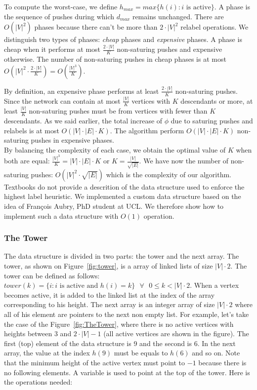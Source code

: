 To compute the worst-case, we define $h_{max} = max\{h(i) : i\text{ is active}\}$. A phase is the sequence of pushes during which $d_{max}$ remains unchanged. There are $O(|V|^2)$ phases because there can't be more than $2\cdot|V|^2$ relabel operations. We distinguish two types of phases: \textit{cheap} phases and \textit{expensive} phases. A phase is cheap when it performs at most $\frac{2\cdot|V|}{K}$ non-saturing pushes and expensive otherwise. The number of non-saturing pushes in cheap phases is at most $O(|V|^2 \cdot \frac{2\cdot|V|}{K}) = O(\frac{|V|^3}{K})$.

By definition, an expensive phase performs at least $\frac{2\cdot|V|}{K}$ non-saturing pushes. Since the network can contain at most $\frac{|V|}{K}$ vertices with $K$ descendants or more, at least $\frac{|V|}{K}$ non-saturing pushes must be from vertices with fewer than $K$ descendants. As we said earlier, the total increase of $\phi$ due to saturing pushes and relabels is at most $O(|V|\cdot|E|\cdot K)$. The algorithm perform $O(|V|\cdot|E|\cdot K)$ non-saturing pushes in expensive phases.\\

By balancing the complexity of each case, we obtain the optimal value of $K$ when both are equal: $\frac{|V|^3}{K} = |V|\cdot|E|\cdot K$ or $K = \frac{|V|}{\sqrt{|E|}}$. We have now the number of non-saturing pushes: $O(|V|^2\cdot\sqrt{|E|})$ which is the complexity of our algorithm.\\

Textbooks do not provide a descrition of the data structure used to enforce the highest label heuristic. We implemented a custom data structure based on the idea of Fran\c cois Aubry, PhD student at UCL. We therefore show how to implement such a data structure with $O(1)$ operation.

\subsubsection{The Tower} %

The data structure is divided in two parts: the tower and the next array. The tower, as shown on Figure~\ref{fig:tower}, is a array of linked lists of size $|V|\cdot 2$. The tower can be defined as follows: $tower(k) = \{i : i \text{ is active and } h(i) = k\} \text{ } \forall \text{ } 0 \le k < |V|\cdot 2$. When a vertex becomes active, it is added to the linked list at the index of the array corresponding to his height. The next array is an integer array of size $|V| \cdot 2$ where all of his element are pointers to the next non empty list. For example, let's take the case of the Figure~\ref{fig:TheTower}, where there is no active vertices with heights between 3 and $2 \cdot |V|-1$ (all active vertices are shown in the figure). The first (top) element of the data structure is 9 and the second is 6. In the next array, the value at the index $h(9)$ must be equals to $h(6)$ and so on. Note that the minimum height of the active vertex must point to $-1$ because there is no following elements. A variable is used to point at the top of the tower. Here is the operations needed:

